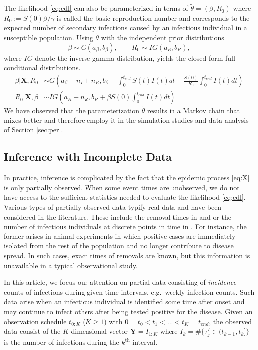\documentclass[12pt]{article}
\begin{document}
The likelihood \eqref{eq:cdl} can also be parameterized in terms of $\tilde{\theta} = (\beta, R_0)$ where $R_0 := S(0) \beta / \gamma$ is called the basic reproduction number and corresponds to the expected number of secondary infections caused by an infectious individual in a susceptible population. Using $\tilde{\theta}$ with the independent prior distributions
\begin{equation}
	\label{eq:pri2}
	\beta \sim G(a_{\beta}, b_{\beta}), \qquad R_0 \sim IG(a_{R}, b_{R}),
\end{equation}
where $IG$ denote the inverse-gamma distribution, yields the closed-form full conditional distributions.
\begin{align}		\label{eq:posterior_theta2}
	\beta | \mathbf{X}, R_0 & \sim G\left( a_{\beta} + n_I + n_R, b_{\beta} + \int_{0}^{t_{end}} S(t)I(t) dt + \frac{S(0)}{R_0} \int_{0}^{t_{end}} I(t) dt\right) \\
	R_0 | \mathbf{X}, \beta & \sim IG\left( a_{R} + n_R, b_{R} + \beta S(0) \int_{0}^{t_{end}} I(t) dt\right)
\end{align}
We have observed that the parameterization $\tilde{\theta}$ results in a Markov chain that mixes better and therefore employ it in the simulation studies and data analysis of Section \ref{sec:per}.

\subsection{Inference with Incomplete Data}
\label{sec:iid}

In practice, inference is complicated by the fact that the epidemic process \eqref{eq:X} is only partially observed. When some event times are unobserved, we do not have access to the sufficient statistics needed to evaluate the likelihood \eqref{eq:cdl}. Various types of partially observed data typify real data and have been considered in the literature. These include the removal times in \cite{Gibson.1998} and \cite{ONeill.1999} or the number of infectious individuals at discrete points in time in \cite{Fintzi.2017}. For instance, the former arises in animal experiments in which positive cases are immediately isolated from the rest of the population and no longer contribute to disease spread. In such cases, exact times of removals are known, but this information is unavailable in a typical observational study.

In this article, we focus our attention on partial data consisting of \textit{incidence} counts of infections during given time intervals, e.g.\ weekly infection counts. Such data arise when an infectious individual is identified some time after onset and may continue to infect others after being tested positive for the disease. Given an observation schedule $t_{0:K}$ ($K \ge 1$) with $0 = t_0 < t_1 < \dots < t_K = t_{end}$, the observed data consist of the $K$-dimensional vector $\mathbf{Y} = I_{1:K}$ where $I_k = \#\{\tau^I_j \in (t_{k-1}, t_k]\}$ is the number of infections during the $k^{\text{th}}$ interval.
\end{document}
